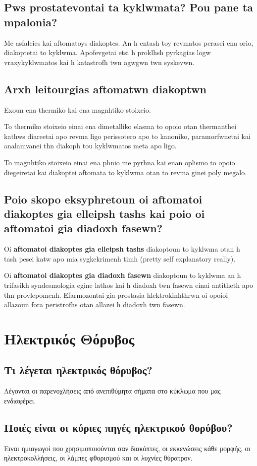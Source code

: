 \documentclass{article}
\begin{document}
\subsection{Pws prostatevontai ta kyklwmata? Pou pane ta mpalonia?}
Me asfaleies kai aftomatoys diakoptes. An h entash toy revmatos perasei ena orio, diakoptetai to kyklwma. Apofevgetai etsi h proklhsh pyrkagias logw vraxykyklwmatos kai h katastrofh twn agwgwn twn syskevwn.

\subsection{Arxh leitourgias aftomatwn diakoptwn}
Exoun ena thermiko kai ena magnhtiko stoixeio. 

To thermiko stoixeio einai ena dimetalliko elasma to opoio otan thermanthei kathws diareetai apo revma ligo perissotero apo to kanoniko, paramorfwnetai kai analamvanei thn diakoph tou kyklwmatos meta apo ligo. 

To magnhtiko stoixeio einai ena phnio me pyrhna kai enan oplismo to opoio diegeiretai kai diakoptei aftomata to kyklwma otan to revma ginei poly megalo.

\subsection{Poio skopo eksyphretoun oi aftomatoi diakoptes gia elleipsh tashs kai poio oi aftomatoi gia diadoxh fasewn?}

Oi \textbf{aftomatoi diakoptes gia elleipsh tashs} diakoptoun to kyklwma otan h tash pesei katw apo mia sygkekrimenh timh (pretty self explanatory really). 

Oi \textbf{aftomatoi diakoptes gia diadoxh fasewn} diakoptoun to kyklwma an h trifasikh syndesmologia egine lathos kai h diadoxh twn fasewn einai antitheth apo thn provlepomenh. Efarmozontai gia prostasia hlektrokinhthrwn oi opoioi allazoun fora peristrofhs otan allazei h diadoxh twn fasewn.

\section{Ηλεκτρικός Θόρυβος}
\subsection{Τι λέγεται ηλεκτρικός θόρυβος?}
Λέγονται οι παρενοχλήσεις από ανεπιθύμητα σήματα στο κύκλωμα που μας ενδιαφέρει.

\subsection{Ποιές είναι οι κύριες πηγές ηλεκτρικού θορύβου?}
Ειναι ημιαγωγοί που χρησιμοποιούνται σαν διακόπτες, οι εκκενώσεις κάθε μορφής, οι ηλεκτροκολλήσεις, οι λάμπες φθορισμού και οι λυχνίες θύρατρον.
\end{document}
